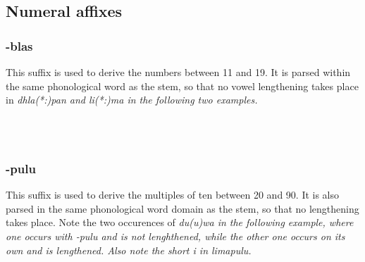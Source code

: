 \subsection{Numeral affixes}\label{sec:morph:Numeralaffixes}
\subsubsection{-blas}\label{sec:morph:-blas}
This suffix is used to derive the numbers between 11 and 19. It is parsed within the same phonological word as the stem, so that no vowel lengthening takes place in \em dhla(*:)pan \em and \em li(*:)ma \em in the following two examples.


\\ 
 
\\ 


\subsubsection{-pulu}\label{sec:morph:-pulu}
This suffix is used to derive the multiples of ten between 20 and 90. It is also parsed in the same phonological word domain as the stem, so that no lengthening takes place. Note the two occurences of \em du(u)wa \em in the following example, where one occurs with \em -pulu \em  and is not lenghthened, while the other one occurs on its own and is lengthened. Also note the short \em i \em in \em limapulu\em.


\\ 

